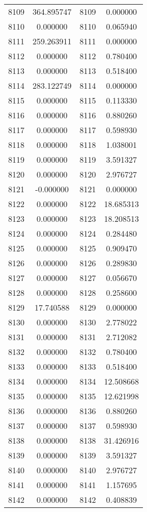 \documentclass[12pt]{article}
\begin{document}
\begin{longtable}{@{}cccc@{}}
8109 & 364.895747 & 8109 & 0.000000 \\
8110 & 0.000000 & 8110 & 0.065940 \\
8111 & 259.263911 & 8111 & 0.000000 \\
8112 & 0.000000 & 8112 & 0.780400 \\
8113 & 0.000000 & 8113 & 0.518400 \\
8114 & 283.122749 & 8114 & 0.000000 \\
8115 & 0.000000 & 8115 & 0.113330 \\
8116 & 0.000000 & 8116 & 0.880260 \\
8117 & 0.000000 & 8117 & 0.598930 \\
8118 & 0.000000 & 8118 & 1.038001 \\
8119 & 0.000000 & 8119 & 3.591327 \\
8120 & 0.000000 & 8120 & 2.976727 \\
8121 & -0.000000 & 8121 & 0.000000 \\
8122 & 0.000000 & 8122 & 18.685313 \\
8123 & 0.000000 & 8123 & 18.208513 \\
8124 & 0.000000 & 8124 & 0.284480 \\
8125 & 0.000000 & 8125 & 0.909470 \\
8126 & 0.000000 & 8126 & 0.289830 \\
8127 & 0.000000 & 8127 & 0.056670 \\
8128 & 0.000000 & 8128 & 0.258600 \\
8129 & 17.740588 & 8129 & 0.000000 \\
8130 & 0.000000 & 8130 & 2.778022 \\
8131 & 0.000000 & 8131 & 2.712082 \\
8132 & 0.000000 & 8132 & 0.780400 \\
8133 & 0.000000 & 8133 & 0.518400 \\
8134 & 0.000000 & 8134 & 12.508668 \\
8135 & 0.000000 & 8135 & 12.621998 \\
8136 & 0.000000 & 8136 & 0.880260 \\
8137 & 0.000000 & 8137 & 0.598930 \\
8138 & 0.000000 & 8138 & 31.426916 \\
8139 & 0.000000 & 8139 & 3.591327 \\
8140 & 0.000000 & 8140 & 2.976727 \\
8141 & 0.000000 & 8141 & 1.157695 \\
8142 & 0.000000 & 8142 & 0.408839 \\

\end{longtable}
\end{document}
